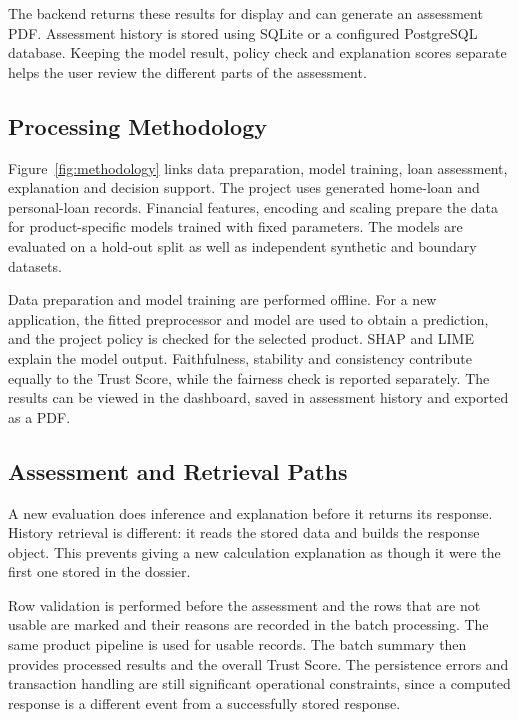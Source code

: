 The backend returns these results for display and can generate an assessment PDF. Assessment history is stored using SQLite or a configured PostgreSQL database. Keeping the model result, policy check and explanation scores separate helps the user review the different parts of the assessment.


\subsection{Processing Methodology}
Figure~\ref{fig:methodology} links data preparation, model training, loan assessment, explanation and decision support. The project uses generated home-loan and personal-loan records. Financial features, encoding and scaling prepare the data for product-specific models trained with fixed parameters. The models are evaluated on a hold-out split as well as independent synthetic and boundary datasets.

\begin{samepage}
Data preparation and model training are performed offline. For a new application, the fitted preprocessor and model are used to obtain a prediction, and the project policy is checked for the selected product. SHAP and LIME explain the model output. Faithfulness, stability and consistency contribute equally to the Trust Score, while the fairness check is reported separately. The results can be viewed in the dashboard, saved in assessment history and exported as a PDF.
\end{samepage}


\subsection{Assessment and Retrieval Paths}
A new evaluation does inference and explanation before it returns its response. History retrieval is different: it reads the stored data and builds the response object. This prevents giving a new calculation explanation as though it were the first one stored in the dossier.

Row validation is performed before the assessment and the rows that are not usable are marked and their reasons are recorded in the batch processing. The same product pipeline is used for usable records. The batch summary then provides processed results and the overall Trust Score. The persistence errors and transaction handling are still significant operational constraints, since a computed response is a different event from a successfully stored response.

